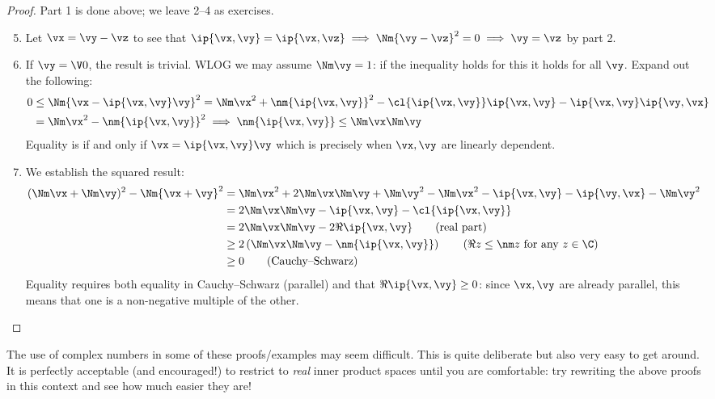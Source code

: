 \begin{proof}
Part 1 is done above; we leave 2--4 as exercises.
\begin{enumerate}\setcounter{enumi}{4}
  \item Let $\vx=\vy-\vz$ to see that $\ip{\vx,\vy}=\ip{\vx,\vz}\implies \Nm{\vy-\vz}^2=0\implies \vy=\vz$ by part 2.
  \item If $\vy=\V0$, the result is trivial. WLOG we may assume $\Nm\vy=1$: if the inequality holds for this it holds for all $\vy$. Expand out the following:
  \begin{align*}
  0&\le\Nm{\vx-\ip{\vx,\vy}\vy}^2 =\Nm\vx^2+\nm{\ip{\vx,\vy}}^2- \cl{\ip{\vx,\vy}}\ip{\vx,\vy}-\ip{\vx,\vy}\ip{\vy,\vx}\\
  &=\Nm\vx^2-\nm{\ip{\vx,\vy}}^2 \implies \nm{\ip{\vx,\vy}}\le\Nm\vx\Nm\vy
  \end{align*}
  Equality is if and only if $\vx=\ip{\vx,\vy}\vy$ which is precisely when $\vx,\vy$ are linearly dependent.
  \item We establish the squared result:
  \begin{align*}
  (\Nm\vx+\Nm\vy)^2-\Nm{\vx+\vy}^2&=\Nm\vx^2+2\Nm\vx\Nm\vy+\Nm\vy^2-\Nm\vx^2-\ip{\vx,\vy}-\ip{\vy,\vx}-\Nm\vy^2\\
  &=2\Nm\vx\Nm\vy-\ip{\vx,\vy}-\cl{\ip{\vx,\vy}}\\
  &=2\Nm\vx\Nm\vy-2\Re\ip{\vx,\vy}\tag{real part}\\
  &\ge 2\left(\Nm\vx\Nm\vy-\nm{\ip{\vx,\vy}}\right) \tag{$\Re z\le\nm z$ for any $z\in\C$}\\
  &\ge 0 \tag{Cauchy--Schwarz}
  \end{align*}
  Equality requires both equality in Cauchy--Schwarz (parallel) and that $\Re\ip{\vx,\vy}\ge 0$: since $\vx,\vy$ are already parallel, this means that one is a non-negative multiple of the other.\qedhere
\end{enumerate}
\end{proof}


The use of complex numbers in some of these proofs/examples may seem difficult. This is quite deliberate but also very easy to get around. It is perfectly acceptable (and encouraged!) to restrict to \emph{real} inner product spaces until you are comfortable: try rewriting the above proofs in this context and see how much easier they are!

